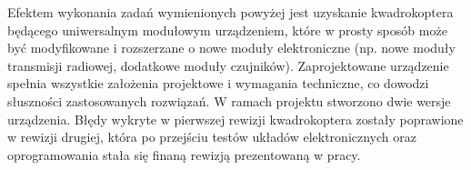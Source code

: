 Efektem wykonania zadań wymienionych powyżej jest uzyskanie kwadrokoptera będącego uniwersalnym modułowym urządzeniem, które w prosty sposób może być modyfikowane i rozszerzane o nowe moduły elektroniczne (np. nowe moduły transmisji radiowej, dodatkowe moduły czujników). 
Zaprojektowane urządzenie spełnia wszystkie założenia projektowe i wymagania techniczne, co dowodzi słuszności zastosowanych rozwiązań.
W ramach projektu stworzono dwie wersje urządzenia. Błędy wykryte w pierwszej rewizji kwadrokoptera zostały poprawione w rewizji drugiej, która po przejściu testów układów elektronicznych oraz oprogramowania stała się finaną rewizją prezentowaną w pracy. 

